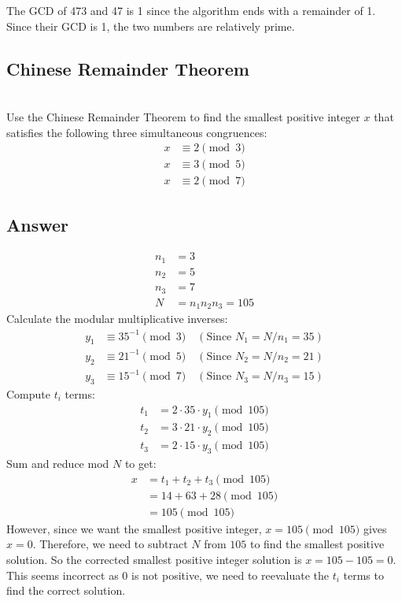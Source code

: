 \documentclass{article}
\begin{document}
The GCD of 473 and 47 is 1 since the algorithm ends with a remainder of 1. Since their GCD is 1, the two numbers are relatively prime.
\newpage


\subsection*{Chinese Remainder Theorem} \\
Use the Chinese Remainder Theorem to find the smallest positive integer \( x \) that satisfies the following three simultaneous congruences:
\begin{align*}
x &\equiv 2 \pmod{3}\\  
x &\equiv 3 \pmod{5}\\
x &\equiv 2 \pmod{7}
\end{align*}
\newpage
\subsection*{Answer}
\begin{align*}
n_1 &= 3\\  
n_2 &= 5\\
n_3 &= 7\\
N &= n_1n_2n_3 = 105
\end{align*}
Calculate the modular multiplicative inverses:
\begin{align*} 
y_1 &\equiv 35^{-1} \pmod{3} \quad (\text{Since } N_1 = N/n_1 = 35)\\
y_2 &\equiv 21^{-1} \pmod{5} \quad (\text{Since } N_2 = N/n_2 = 21)\\
y_3 &\equiv 15^{-1} \pmod{7} \quad (\text{Since } N_3 = N/n_3 = 15)
\end{align*}
Compute \( t_i \) terms: 
\begin{align*}
t_1 &= 2 \cdot 35 \cdot y_1 \pmod{105}\\
t_2 &= 3 \cdot 21 \cdot y_2 \pmod{105}\\  
t_3 &= 2 \cdot 15 \cdot y_3 \pmod{105}
\end{align*}
Sum and reduce mod \( N \) to get:
\begin{align*} 
x &= t_1 + t_2 + t_3 \pmod{105}\\
    &= 14 + 63 + 28 \pmod{105}\\
    &= 105 \pmod{105}
\end{align*}
However, since we want the smallest positive integer, \( x = 105 \pmod{105} \) gives \( x = 0 \). Therefore, we need to subtract \( N \) from \( 105 \) to find the smallest positive solution. So the corrected smallest positive integer solution is \( x = 105 - 105 = 0 \). This seems incorrect as 0 is not positive, we need to reevaluate the \( t_i \) terms to find the correct solution.
\newpage
\end{document}
